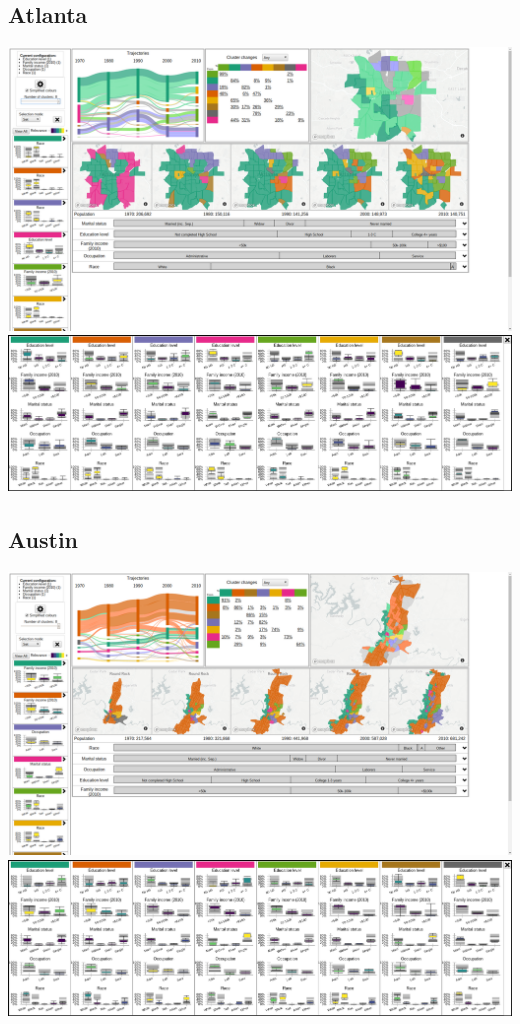\documentclass[a4paper]{article}
\begin{document}
\subsection{Atlanta}
\begin{center}
	\includegraphics[width=\linewidth]{17a.png}
	\includegraphics[width=\linewidth]{17b.png}
\end{center} \clearpage



\subsection{Austin}
\begin{center}
	\includegraphics[width=\linewidth]{18a.png}
	\includegraphics[width=\linewidth]{18b.png}
\end{center} \clearpage
\end{document}

